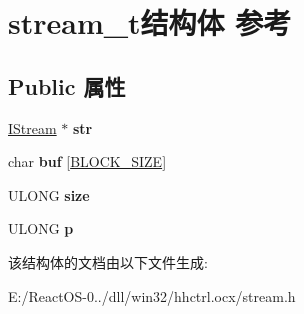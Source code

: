 \hypertarget{structstream__t}{}\section{stream\+\_\+t结构体 参考}
\label{structstream__t}
\subsection*{Public 属性}
\begin{DoxyCompactItemize}
\item 
\mbox{\label{structstream__t_ab0fef1c898f7ccaf21b3e563729a88fd}} 
\hyperlink{interface_i_stream}{I\+Stream} $\ast$ {\bfseries str}
\item 
\mbox{\label{structstream__t_abdd3ee91c417172b42c69ce74bf7ced0}} 
char {\bfseries buf} \mbox{[}\hyperlink{dlist_8c_ad51ded0bbd705f02f73fc60c0b721ced}{B\+L\+O\+C\+K\+\_\+\+S\+I\+ZE}\mbox{]}
\item 
\mbox{\label{structstream__t_a13459382907671a033d134c4e83417bb}} 
U\+L\+O\+NG {\bfseries size}
\item 
\mbox{\label{structstream__t_a24b685beae49168544d727da5165eb9b}} 
U\+L\+O\+NG {\bfseries p}
\end{DoxyCompactItemize}


该结构体的文档由以下文件生成\+:\begin{DoxyCompactItemize}
\item 
E\+:/\+React\+O\+S-\/0../dll/win32/hhctrl.\+ocx/stream.\+h\end{DoxyCompactItemize}
